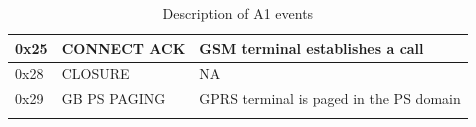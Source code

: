 \documentclass[master,english]{hgbthesis}
\begin{document}
{\begin{longtable}{|l|p{4cm}|p{8cm}|}
		0x25         & CONNECT ACK                          & GSM terminal establishes a call                                                                            \\ \hline
		0x28         & CLOSURE                              & NA                                                                                                         \\ \hline
		0x29         & GB PS PAGING                         & GPRS terminal is paged in the PS domain                                                                    \\ \hline
		\caption{Description of A1 events}
		\label{tab:eventtype}
	\end{longtable}}
\end{document}

